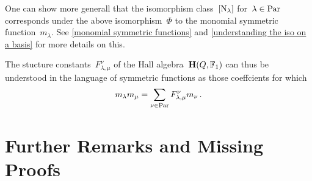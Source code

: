 \documentclass[a4paper, 11pt, twoside=semi]{scrartcl}
\begin{document}
\begin{remark}
  One can show more generall that the isomorphism class~$[ \mathrm{N}_\lambda ]$ for~$\lambda \in \mathrm{Par}$ corresponds under the above isomorphism~$\Phi$ to the monomial symmetric function~$m_\lambda$.
  See \cref{monomial symmetric functions} and \cref{understanding the iso on a basis} for more details on this.

  The stucture constants~$F^\nu_{\lambda, \mu}$ of the Hall algebra~$\mathbf{H}(Q, \mathbb{F}_1)$ can thus be understood in the language of symmetric functions as those coeffcients for which
  \[
    m_\lambda m_\mu
    =
    \sum_{\nu \in \mathrm{Par}} F^\nu_{\lambda, \mu} m_\nu \,.
  \]
%
%
\end{remark}





\newpage
\appendix
\section{Further Remarks and Missing Proofs}
\end{document}
